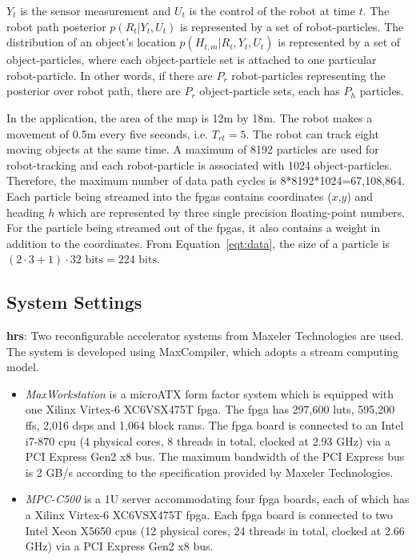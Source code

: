 $Y_t$ is the sensor measurement and $U_t$ is the control of the robot at time $t$.
The robot path posterior $p(R_t|Y_t,U_t)$ is represented by a set of robot-particles.
The distribution of an object's location $p(H_{t,m}|R_t,Y_t,U_t)$ is represented by a set of object-particles, where each object-particle set is attached to one particular robot-particle.
In other words, if there are $P_r$ robot-particles representing the posterior over robot path, there are $P_r$ object-particle sets, each has $P_h$ particles.

In the application, the area of the map is 12m by 18m.
The robot makes a movement of 0.5m every five seconds, i.e. $T_{rt} = 5$.
The robot can track eight moving objects at the same time.
A maximum of 8192 particles are used for robot-tracking and each robot-particle is associated with 1024 object-particles.
Therefore, the maximum number of data path cycles is 8*8192*1024=67,108,864.
Each particle being streamed into the \gls{fpga}s contains coordinates ($x$,$y$) and heading $h$ which are represented by three single precision floating-point numbers.
For the particle being streamed out of the \gls{fpga}s, it also contains a weight in addition to the coordinates.
From Equation~\ref{eqt:data}, the size of a particle is $(2 \cdot 3 + 1) \cdot 32 \mbox{ bits} = 224 \mbox{ bits}$.

\subsection{System Settings}

\textbf{\gls{hrs}}: Two reconfigurable accelerator systems from Maxeler Technologies are used.
The system is developed using MaxCompiler, which adopts a stream computing model.
\begin{itemize}
\item \textit{MaxWorkstation} is a microATX form factor system which is equipped with one Xilinx Virtex-6 XC6VSX475T \gls{fpga}.
The \gls{fpga} has 297,600 \glspl{lut}, 595,200 \glspl{ff}, 2,016 \glspl{dsp} and 1,064 block \glspl{ram}. 
The \gls{fpga} board is connected to an Intel i7-870 \gls{cpu} (4 physical cores, 8 threads in total, clocked at 2.93 GHz) via a PCI Express Gen2 x8 bus.
The maximum bandwidth of the PCI Express bus is 2 GB/s according to the specification provided by Maxeler Technologies.
\item \textit{MPC-C500} is a 1U server accommodating four \gls{fpga} boards, each of which has a Xilinx Virtex-6 XC6VSX475T \gls{fpga}.
Each \gls{fpga} board is connected to two Intel Xeon X5650 \gls{cpu}s (12 physical cores, 24 threads in total, clocked at 2.66 GHz) via a PCI Express Gen2 x8 bus.
\end{itemize}

